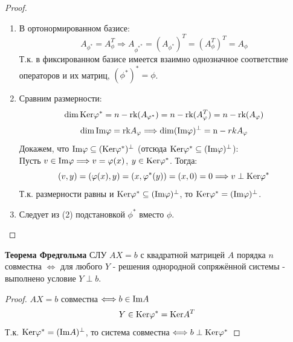 \begin{proof} \tab
    \begin{enumerate}
        \item В ортонормированном базисе:
        $$A_{\phi^{*}} = A_{\phi}^T \Longrightarrow  A_{{\phi^{*}}^{*}} = (A_{\phi^{*}})^T = (A_{\phi}^T)^T = A_{\phi}$$
        Т.к. в фиксированном базисе имеется взаимно однозначное соответствие операторов и их матриц, $(\phi^{*})^{*} = \phi$.
        \item Сравним размерности:
        $$\dim \textup{Ker}\phi^{*} = n - \textup{rk}(A_{\phi^{*}}) = n - \textup{rk}(A_{\phi}^T) = n - \textup{rk}(A_{\phi})$$
        $$\dim \textup{Im}\phi = \textup{rk} A_{\phi} \Longrightarrow \dim (\textup{Im}\phi)^{\perp} = \textup n - {rk} A_{\phi}$$
        Докажем, что $\textup{Im}\phi \subseteq (\textup{Ker}\phi^{*})^{\perp}$  (отсюда $\textup{Ker}\phi^{*} \subseteq (\textup{Im}\phi)^{\perp}$):\\
        Пусть $v \in \textup{Im}\phi \Longrightarrow v = \phi(x)$, $y \in \textup{Ker}\phi^{*}$. Тогда:
        $$(v, y) = (\phi(x), y) = (x, \phi^{*}(y)) = (x, 0) = 0 \Longrightarrow v \perp \textup{Ker}\phi^{*}$$
        Т.к. размерности равны и $\textup{Ker}\phi^{*} \subseteq (\textup{Im}\phi)^{\perp}$, то $\textup{Ker}\phi^{*} = (\textup{Im}\phi)^{\perp}$.
        \item Следует из (2) подстановкой $\phi^{*}$ вместо $\phi$.
    \end{enumerate}
\end{proof}
\begin{consequense}\textbf{Теорема Фредгольма}
    СЛУ $AX = b$ с квадратной матрицей $A$ порядка $n$ совместна $\Longleftrightarrow $ для любого $Y$ - решения однородной сопряжённой системы - выполнено условие $Y \perp b$. 
\end{consequense}
\begin{proof}
    $AX = b$ совместна $\Longleftrightarrow  b \in \textup{Im}A$
    $$Y \in \textup{Ker}\phi^{*} = \textup{Ker}A^T$$
    Т.к. $\textup{Ker}\phi^{*} = (\textup{Im}A)^\perp$, то система совместна $\Longleftrightarrow  b \perp \textup{Ker}\phi^{*}$  
\end{proof}
